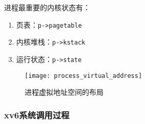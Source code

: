进程最重要的内核状态有：
\begin{enumerate}
	\item 页表：\texttt{p->pagetable}
	\item 内核堆栈：\texttt{p->kstack}
	\item 运行状态：\texttt{p->state}
\end{enumerate}

\begin{figure}[!htb]
	\centering
	\texttt{[image: process\_virtual\_address]}
	\caption{进程虚拟地址空间的布局}
	\label{fig:process_virtual_address}
\end{figure}

\subsubsection{xv6系统调用过程}

